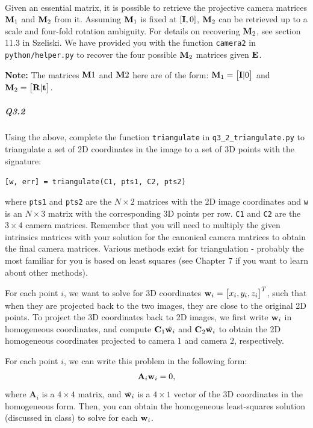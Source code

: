 \hfill\\

Given an essential matrix, it is possible to retrieve the projective camera matrices ${\bf M}_1$ and ${\bf M}_2$ from it.  Assuming ${\bf M}_1$ is fixed at $[{\bf I},0]$, ${\bf M}_2$ can be retrieved up to a scale and four-fold rotation ambiguity. For details on recovering ${\bf M}_2$, see section 11.3 in Szeliski. We have provided you with the function \texttt{camera2} in \texttt{python/helper.py} to recover the four possible ${\bf M}_2$ matrices given ${\bf E}$.

\textbf{Note: } The matrices ${\bf M}1$ and ${\bf M}2$ here are of the form: 
${\bf M}_1 = \begin{bmatrix}{\bf I} | 0\end{bmatrix} $ and ${\bf M}_2 = \begin{bmatrix}{\bf R} | {\bf t}\end{bmatrix} $.

\subparagraph*{Q3.2}
Using the above, complete the function \texttt{triangulate} in \texttt{q3\_2\_triangulate.py} to triangulate a set of 2D coordinates in the image to a set of 3D points with the signature:
\begin{center}
    \texttt{[w, err] = triangulate(C1, pts1, C2, pts2)}
\end{center}
where \texttt{pts1} and \texttt{pts2} are the $N \times 2$ matrices with the 2D image coordinates and \texttt{w} is an $N \times 3$ matrix with the corresponding 3D points per row.  \texttt{C1} and \texttt{C2} are the $3 \times 4$ camera matrices. Remember that you will need to multiply the given intrinsics matrices with your solution for the canonical camera matrices to obtain the final camera matrices. Various methods exist for triangulation -
probably the most familiar for you is based on least squares (see \cite{szeliski2022computer} Chapter 7 if you want to learn about other methods).

For each point $i$, we want to solve for 3D coordinates ${\bf w}_i = \begin{bmatrix}x_i, y_i, z_i\end{bmatrix}^T$, such that when they are projected back to the two images, they are close to the original 2D points. To project the 3D coordinates back to 2D images, we first write ${\bf w}_i$ in homogeneous coordinates, and compute $\mathbf{C}_1 \tilde{{\bf w}_i}$ and $\mathbf{C}_2 \tilde{{\bf w}_i}$ to obtain the 2D homogeneous coordinates projected to camera $1$ and camera $2$, respectively.

For each point $i$, we can write this problem in the following form:
\begin{align*}
\mathbf{A}_i{\bf w}_i = 0,
\end{align*}
where $\mathbf{A}_i$ is a $4\times 4$ matrix, and $\tilde{{\bf w}_i}$ is a $4\times 1$ vector of the 3D coordinates in the homogeneous form. Then, you can obtain the homogeneous least-squares solution (discussed in class) to solve for each ${\bf w}_i$.

